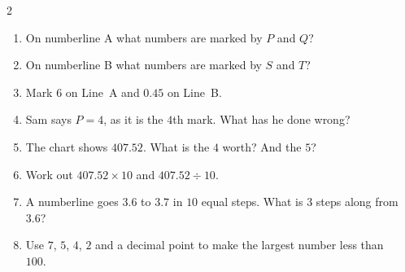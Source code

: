 \documentclass{beamer}
\newcommand{\ashow}[1]{\uncover<2->{\textcolor{red}{\small #1}}}
\newcommand{\qtight}{%
  \setlength{\itemsep}{0pt}\setlength{\parskip}{0pt}\setlength{\parsep}{0pt}%
  \setlength{\topsep}{0pt}\setlength{\partopsep}{0pt}%
}
\begin{document}
\begin{frame}
\begin{columns}[T]
\begin{center}
\begin{tikzpicture}[scale=0.95]
\end{tikzpicture}
\end{center}


\small
\begin{multicols}{2}
\begin{enumerate}\qtight

  \item On numberline A what numbers are marked by  $P$ and $Q$? \ashow{$3$ and $8$}

  \item On numberline B what numbers are marked by  $S$ and $T$? \ashow{$0.3$ and $0.9$}

  \item Mark $6$ on Line~A and $0.45$ on Line~B.

  \item Sam says $P=4$, as it is the $4$th mark. What has he done wrong? \ashow{Counted marks, not steps: $P=3$}
  \columnbreak

  \item The chart shows $407.52$. What is the $4$ worth? And the $5$? \ashow{$400$ and $0.5$}


  \item Work out $407.52\times 10$ and $407.52\div 10$. \ashow{$4075.2$ and $40.752$}

  \item A numberline goes $3.6$ to $3.7$ in $10$ equal steps. What is $3$ steps along from $3.6$? \ashow{$3.63$}

  \item Use $7$, $5$, $4$, $2$ and a decimal point to make the largest number less than $100$. \ashow{$75.42$}

\end{enumerate}
\end{multicols}

\end{columns}

\end{frame}
\end{document}
